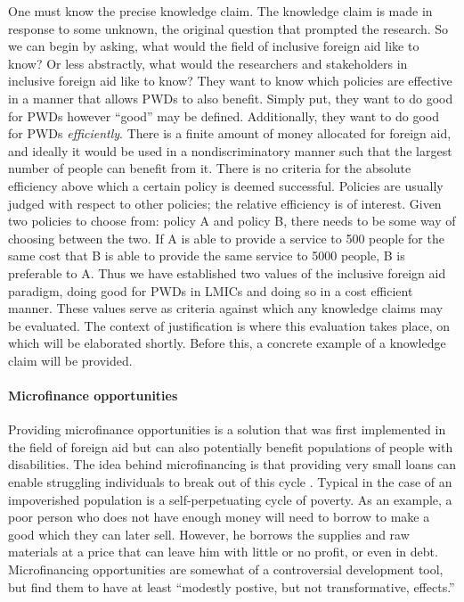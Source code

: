 \documentclass[a4paper]{article}
\begin{document}
One must know the precise knowledge claim. The knowledge claim is made in
response to some unknown, the original question that prompted the research. So
we can begin by asking, what would the field of inclusive foreign aid like to
know? Or less abstractly, what would the researchers and stakeholders in
inclusive foreign aid like to know? They want to know which policies are
effective in a manner that allows PWDs to also benefit. Simply put, they want
to do good for PWDs however ``good'' may be defined. Additionally, they want
to do good for PWDs \emph{efficiently}. There is a finite amount of money
allocated for foreign aid, and ideally it would be used in a nondiscriminatory
manner such that the largest number of people can benefit from it. There is no
criteria for the absolute efficiency above which a certain policy is deemed
successful. Policies are usually judged with respect to other policies; the
relative efficiency is of interest. Given two policies to choose from: policy
A and policy B, there needs to be some way of choosing between the two. If A
is able to provide a service to 500 people for the same cost that B is able to
provide the same service to 5000 people, B is preferable to A. Thus we have
established two values of the inclusive foreign aid paradigm, doing good for
PWDs in LMICs and doing so in a cost efficient manner. These values serve as
criteria against which any knowledge claims may be evaluated. The context of
justification is where this evaluation takes place, on which will be
elaborated shortly. Before this, a concrete example of a knowledge claim will
be provided.

\paragraph{Microfinance opportunities}


Providing microfinance opportunities is a solution that was first implemented
in the field of foreign aid but can also potentially benefit populations of
people with disabilities. The idea behind microfinancing is that providing
very small loans can enable struggling individuals to break out of this
cycle \citep{wendt2006building}. Typical in the case of an impoverished
population is a self-perpetuating cycle of poverty. As an example, a poor
person who does not have enough money will need to borrow to make a good which
they can later sell. However, he borrows the supplies and raw materials at a
price that can leave him with little or no profit, or even in debt.
Microfinancing opportunities are somewhat of a controversial development tool,
but \cite{banerjee2015six} find them to have at least ``modestly postive, but
not transformative, effects.'' 
\end{document}
